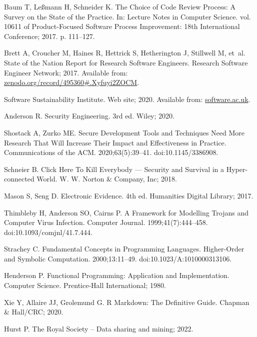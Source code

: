 \documentclass{article}
\begin{document}
\begin{thebibliography}{10}
Baum T, {Le\ss mann} H, Schneider K.
\newblock The Choice of Code Review Process: A Survey on the State of the
  Practice.
\newblock In: Lecture Notes in Computer Science. vol. 10611 of Product-Focused
  Software Process Improvement: 18th International Conference; 2017. p.
  111--127.

Brett A, Croucher M, Haines R, Hettrick S, Hetherington J, Stillwell M, et~al.
\newblock State of the Nation Report for Research Software Engineers.
\newblock Research Software Engineer Network; 2017.
\newblock Available from: \url{zenodo.org/record/495360#.Xyfuyi2ZOCM}.

{Software Sustainability Institute}. Web site; 2020.
\newblock Available from: \url{software.ac.uk}.

Anderson R.
\newblock Security Engineering.
\newblock 3rd ed. Wiley; 2020.

Shostack A, Zurko ME.
\newblock Secure Development Tools and Techniques Need More Research That Will
  Increase Their Impact and Effectiveness in Practice.
\newblock Communications of the ACM. 2020;63(5):39--41.
\newblock doi:{10.1145/3386908}.

Schneier B.
\newblock Click Here To Kill Everybody --- Security and Survival in a
  Hyper-connected World.
\newblock W. W. Norton {\&} Company, Inc; 2018.

Mason S, Seng D.
\newblock Electronic Evidence.
\newblock 4th ed. Humanities Digital Library; 2017.

Thimbleby H, Anderson SO, Cairns P.
\newblock A Framework for Modelling Trojans and Computer Virus Infection.
\newblock Computer Journal. 1999;41(7):444--458.
\newblock doi:{10.1093/comjnl/41.7.444}.

Strachey C.
\newblock Fundamental Concepts in Programming Languages.
\newblock Higher-Order and Symbolic Computation. 2000;13:11--49.
\newblock doi:{10.1023/A:1010000313106}.

Henderson P.
\newblock Functional Programming: Application and Implementation.
\newblock Computer Science. Prentice-Hall International; 1980.

Xie Y, Allaire JJ, Grolemund G.
\newblock R Markdown: The Definitive Guide.
\newblock Chapman {\&} Hall/CRC; 2020.

Hurst P. The Royal Society -- Data sharing and mining; 2022.

\end{thebibliography}
\end{document}
